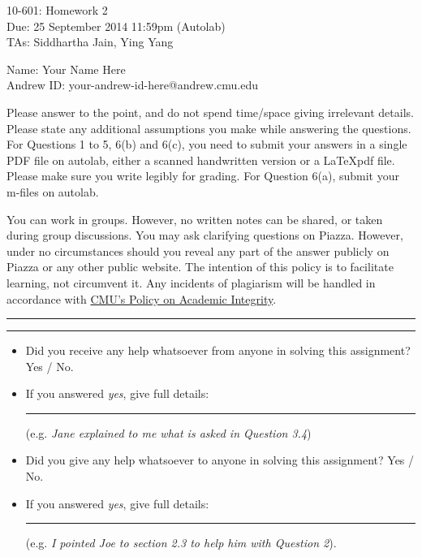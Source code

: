 \documentclass[11pt]{article}
\makeatletter
\newif\ifprint
\newcommand{\mycoursenum}{10-601}
\newcommand{\myhwnum}{2}
\newcommand{\myname}{Your Name Here}
\newcommand{\myandrew}{your-andrew-id-here@andrew.cmu.edu}
\newcommand{\myfirstta}{Siddhartha Jain}
\newcommand{\mysecondta}{Ying Yang}
\newcommand{\question}[2] {\vspace{.25in} \hrule\vspace{0.5em} \noindent{\bf #1: #2} \vspace{0.5em} \hrule \vspace{.10in}}
\makeatother
\begin{document}
\medskip

\thispagestyle{plain}
\begin{center}
{\Large \mycoursenum: Homework \myhwnum} \\
Due: 25 September 2014 11:59pm (Autolab) \\
TAs: \myfirstta, \mysecondta \\
\medskip
\ifprint
Name: \rule{0.5\textwidth}{.4pt} \\
Andrew ID: \rule{0.45\textwidth}{.4pt} \\
\else
Name: \myname \\
Andrew ID: \myandrew \\
\fi
\end{center}

Please answer to the point, and do not spend time/space giving irrelevant details. 
Please state any additional assumptions you make while answering the questions. 
For Questions 1 to 5, 6(b) and 6(c), you need to submit your answers in a single PDF file on autolab, either a scanned handwritten version or a \LaTeX pdf file. 
Please make sure you write legibly for grading.
For Question 6(a), submit your m-files on autolab. 

You can work in groups. However, no written notes can be shared, or taken during group discussions. You may ask clarifying questions on Piazza. However, under no circumstances should you reveal any part of the answer publicly on Piazza or any other public website. The intention of this policy is to facilitate learning, not circumvent it. Any incidents of plagiarism will be handled in accordance with \href{http://www.cmu.edu/policies/documents/Academic%20Integrity.htm}{CMU's Policy on Academic Integrity}.


\question{$\star$}{Code of Conduct Declaration}

\begin{itemize}
	\item Did you receive any help whatsoever from anyone in solving this assignment? Yes / No.
	\item If you answered \emph{yes}, give full details: \rule{0.4\textwidth}{.4pt} (e.g. \emph{Jane explained to me what is asked in Question 3.4})
	\item Did you give any help whatsoever to anyone in solving this assignment? Yes / No.
	\item If you answered \emph{yes}, give full details: \rule{0.4\textwidth}{.4pt} (e.g. \emph{I pointed Joe to section 2.3 to help him with Question 2}).
\end{itemize}
\end{document}
